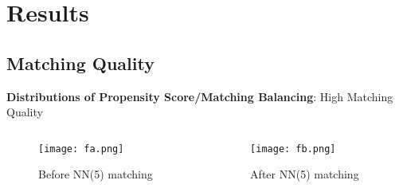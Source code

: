 \documentclass{beamer}	%
\theoremstyle{plain}
\theoremstyle{definition}
\theoremstyle{remark}
\numberwithin{equation}{section}
\begin{document}
\section{Results}
\subsection {Matching Quality}
\begin{frame}
	\textbf{Distributions of Propensity Score/Matching Balancing}: High Matching Quality \\
	\begin{columns}
	\begin{column}{0.5\textwidth}
	\begin{figure}
	\texttt{[image: fa.png]}
	\caption{Before NN(5) matching}
	\end{figure}
	\end{column}
	\begin{column}{0.5\textwidth}
	\begin{figure}
	\texttt{[image: fb.png]}
	\begin{footnotesize}
	\caption{After NN(5) matching}
	\end{footnotesize}
	\end{figure}
	\end{column}
	\end{columns}
\end{frame}
\end{document}
